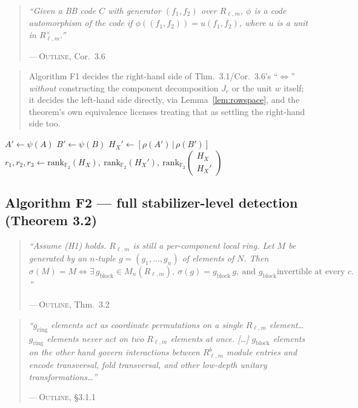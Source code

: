 \documentclass[11pt]{article}
\theoremstyle{plain}
\theoremstyle{definition}
\newenvironment{paperquote}[1]{%
  \def\paperquotecite{#1}%
  \begin{quotation}\noindent\itshape\small
}{%
  \normalfont\par\hfill---\,\textsc{Outline}, \paperquotecite\medskip
  \end{quotation}
}
\newcommand{\pq}[2]{\begin{paperquote}{#1}#2\end{paperquote}}
\newenvironment{mynote}{%
  \begin{quotation}\noindent\small
}{%
  \end{quotation}
}
\begin{document}
\pq{Cor.\ 3.6}{%
``Given a BB code $C$ with generator $(f_1,f_2)$ over $R_{\ell,m}$, $\phi$
is a code automorphism of the code if $\phi((f_1,f_2))=u(f_1,f_2)$, where
$u$ is a unit in $R_{\ell,m}^\times$.''
}

\begin{mynote}
Algorithm F1 decides the right-hand side of Thm.\ 3.1/Cor.\ 3.6's
``$\iff$'' \emph{without} constructing the component decomposition $J_c$ or
the unit $w$ itself; it decides the left-hand side directly, via
Lemma~\ref{lem:rowspace}, and the theorem's own equivalence licenses
treating that as settling the right-hand side too.
\end{mynote}

\begin{algorithm}[H]
\caption{Ring-level automorphism test (realizes Thm.\ 3.1 / Cor.\ 3.6)}
$A' \gets \psi(A)$ 
$B' \gets \psi(B)$\;
$H_X' \gets [\rho(A')\,|\,\rho(B')]$ 
$r_1,r_2,r_3 \gets \mathrm{rank}_{\mathbb F_2}(H_X),\ \mathrm{rank}_{\mathbb F_2}(H_X'),\ \mathrm{rank}_{\mathbb F_2}\!\begin{pmatrix}H_X\\H_X'\end{pmatrix}$\;
 
\end{algorithm}

\subsection{Algorithm F2 --- full stabilizer-level detection (Theorem 3.2)}

\pq{Thm.\ 3.2}{%
``Assume (H1) holds. $R_{\ell,m}$ is still a per-component local ring. Let
$M$ be generated by an $n$-tuple $g=(g_1,\ldots,g_n)$ of elements of $N$.
Then
\[ \sigma(M)=M \iff \exists\, g_{\mathrm{block}}\in M_n(R_{\ell,m}),\
\sigma(g)=g_{\mathrm{block}}\,g,\ \text{and } g_{\mathrm{block}}\text{
invertible at every } c. \]''
}

\pq{\S3.1.1}{%
``$g_{\mathrm{ring}}$ elements act as coordinate permutations on a single
$R_{\ell,m}$ element\ldots $g_{\mathrm{ring}}$ elements never act on two
$R_{\ell,m}$ elements at once. [\ldots] $g_{\mathrm{block}}$ elements on the
other hand govern interactions between $R_{\ell,m}^b$ module entries and
encode transversal, fold transversal, and other low-depth unitary
transformations\ldots''
}
\end{document}
